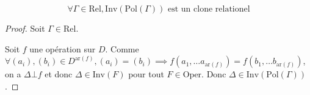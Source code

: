 \documentclass[12pt]{article}
\newcommand\Rel{\text{Rel}}
\newcommand\Oper{\text{Oper}}
\newcommand\Inv{\text{Inv}}
\newcommand\Pol{\text{Pol}}
\newcommand\ar{\text{ar}}
\begin{document}
\begin{lem}{}
    \[\forall \Gamma\in\Rel, \Inv(\Pol(\Gamma)) \text{ est un clone relationel}\]
\end{lem}
\begin{proof}
    Soit $\Gamma\in\Rel$.

    Soit $f$ une opération sur $D$. Comme
    $\forall (a_i), (b_i)\in D^{\ar(f)}, (a_i) = (b_i) 
        \implies f(a_1, \dots a_{\ar(f)}) = f(b_1, \dots b_{\ar(f)})$, on a $\Delta\bot f$
    et donc $\Delta\in \Inv(F)$ pour tout $F\in\Oper$. Donc $\Delta\in\Inv(\Pol(\Gamma))$.

\end{proof}
\end{document}
